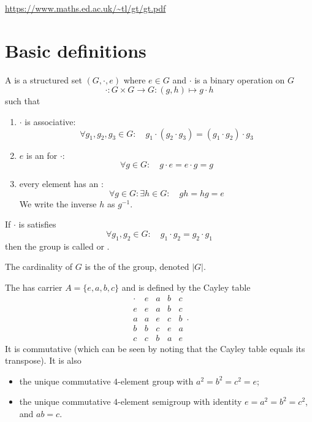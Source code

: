 \url{https://www.maths.ed.ac.uk/~tl/gt/gt.pdf}

\section{Basic definitions}

\begin{definition}
A  is a structured set $(G,\boldsymbol{\cdot}, e)$ where $e\in G$ and $\boldsymbol{\cdot}$ is a binary operation on $G$
\[\boldsymbol{\cdot}: G\times G \to G: (g,h)\mapsto g\cdot h\]
such that
\begin{enumerate}
\item $\boldsymbol{\cdot}$ is associative:
\[ \forall g_1,g_2,g_3 \in G: \quad g_1\cdot (g_2\cdot g_3) = (g_1\cdot g_2)\cdot g_3 \]
\item $e$ is an  for $\boldsymbol{\cdot}$:
\[ \forall g\in G: \quad g\cdot e = e\cdot g = g \]
\item every element has an :
\[ \forall g\in G: \exists h \in G: \quad  gh = hg = e \]
We write the inverse $h$ as $g^{-1}$. 
\end{enumerate}
If $\boldsymbol{\cdot}$ is satisfies
\[ \forall g_1, g_2 \in G: \quad g_1 \cdot g_2 = g_2\cdot g_1 \]
then the group is called  or .

The cardinality of $G$ is the  of the group, denoted $|G|$.
\end{definition}

\begin{example}
The  has carrier $A = \{e,a,b,c\}$ and is defined by the Cayley table
\[ \begin{array}{l|llll}
\boldsymbol{\cdot} & e & a & b & c \\ \hline
e & e & a & b & c \\
a & a & e & c & b \\
b & b & c & e & a \\
c & c & b & a & e
\end{array}. \]
It is commutative (which can be seen by noting that the Cayley table equals its transpose).
It is also
\begin{itemize}
\item the unique commutative $4$-element group with $a^2 = b^2 = c^2 = e$;
\item the unique commutative $4$-element semigroup with identity $e = a^2 = b^2 = c^2$, and $ab = c$.
\end{itemize}
\end{example}

